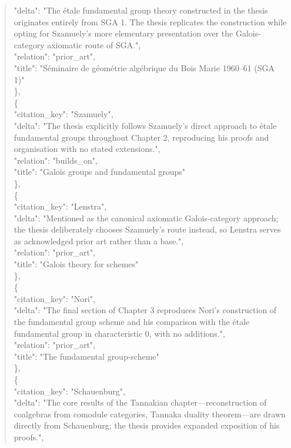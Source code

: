 \documentclass[11pt]{article}
\begin{document}
\begin{quote}
      "delta": "The étale fundamental group theory constructed in the thesis originates entirely from SGA 1. The thesis replicates the construction while opting for Szamuely's more elementary presentation over the Galois-category axiomatic route of SGA.",\\
      "relation": "prior\_art",\\
      "title": "Séminaire de géométrie algébrique du Bois Marie 1960--61 (SGA 1)"\\
    \},\\
    \{\\
      "citation\_key": "Szamuely",\\
      "delta": "The thesis explicitly follows Szamuely's direct approach to étale fundamental groups throughout Chapter 2, reproducing his proofs and organisation with no stated extensions.",\\
      "relation": "builds\_on",\\
      "title": "Galois groups and fundamental groups"\\
    \},\\
    \{\\
      "citation\_key": "Lenstra",\\
      "delta": "Mentioned as the canonical axiomatic Galois-category approach; the thesis deliberately chooses Szamuely's route instead, so Lenstra serves as acknowledged prior art rather than a base.",\\
      "relation": "prior\_art",\\
      "title": "Galois theory for schemes"\\
    \},\\
    \{\\
      "citation\_key": "Nori",\\
      "delta": "The final section of Chapter 3 reproduces Nori's construction of the fundamental group scheme and his comparison with the étale fundamental group in characteristic 0, with no additions.",\\
      "relation": "prior\_art",\\
      "title": "The fundamental group-scheme"\\
    \},\\
    \{\\
      "citation\_key": "Schauenburg",\\
      "delta": "The core results of the Tannakian chapter---reconstruction of coalgebras from comodule categories, Tannaka duality theorem---are drawn directly from Schauenburg; the thesis provides expanded exposition of his proofs.",\\

\end{quote}
\end{document}
